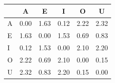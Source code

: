 \begin{tabular}{lccccc}
\toprule
\rowcolor{col01}
 & A & E & I & O & U \\
\midrule
A & 0.00 & 1.63 & 0.12 & 2.22 & 2.32 \\
E & 1.63 & 0.00 & 1.53 & 0.69 & 0.83 \\
I & 0.12 & 1.53 & 0.00 & 2.10 & 2.20 \\
O & 2.22 & 0.69 & 2.10 & 0.00 & 0.15 \\
U & 2.32 & 0.83 & 2.20 & 0.15 & 0.00 \\
\bottomrule
\end{tabular}
